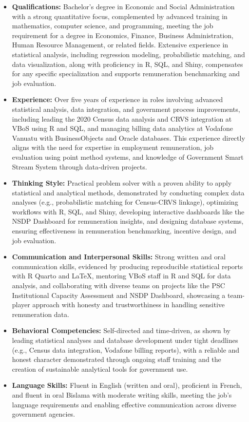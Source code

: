 \documentclass[
  letterpaper,
  DIV=11,
  numbers=noendperiod]{scrartcl}
\providecommand{\tightlist}{%
  \setlength{\itemsep}{0pt}\setlength{\parskip}{0pt}}
\begin{document}
\begin{itemize}
\tightlist
\item
  \textbf{Qualifications:} Bachelor's degree in Economic and Social
  Administration with a strong quantitative focus, complemented by
  advanced training in mathematics, computer science, and programming,
  meeting the job requirement for a degree in Economics, Finance,
  Business Administration, Human Resource Management, or related fields.
  Extensive experience in statistical analysis, including regression
  modeling, probabilistic matching, and data visualization, along with
  proficiency in R, SQL, and Shiny, compensates for any specific
  specialization and supports remuneration benchmarking and job
  evaluation.
\item
  \textbf{Experience:} Over five years of experience in roles involving
  advanced statistical analysis, data integration, and government
  process improvements, including leading the 2020 Census data analysis
  and CRVS integration at VBoS using R and SQL, and managing billing
  data analytics at Vodafone Vanuatu with BusinessObjects and Oracle
  databases. This experience directly aligns with the need for expertise
  in employment remuneration, job evaluation using point method systems,
  and knowledge of Government Smart Stream System through data-driven
  projects.
\item
  \textbf{Thinking Style:} Practical problem solver with a proven
  ability to apply statistical and analytical methods, demonstrated by
  conducting complex data analyses (e.g., probabilistic matching for
  Census-CRVS linkage), optimizing workflows with R, SQL, and Shiny,
  developing interactive dashboards like the NSDP Dashboard for
  remuneration insights, and designing database systems, ensuring
  effectiveness in remuneration benchmarking, incentive design, and job
  evaluation.
\item
  \textbf{Communication and Interpersonal Skills:} Strong written and
  oral communication skills, evidenced by producing reproducible
  statistical reports with R Quarto and LaTeX, mentoring VBoS staff in R
  and SQL for data analysis, and collaborating with diverse teams on
  projects like the PSC Institutional Capacity Assessment and NSDP
  Dashboard, showcasing a team-player approach with honesty and
  trustworthiness in handling sensitive remuneration data.
\item
  \textbf{Behavioral Competencies:} Self-directed and time-driven, as
  shown by leading statistical analyses and database development under
  tight deadlines (e.g., Census data integration, Vodafone billing
  reports), with a reliable and honest character demonstrated through
  ongoing staff training and the creation of sustainable analytical
  tools for government use.
\item
  \textbf{Language Skills:} Fluent in English (written and oral),
  proficient in French, and fluent in oral Bislama with moderate writing
  skills, meeting the job's language requirements and enabling effective
  communication across diverse government agencies.
\end{itemize}
\end{document}
